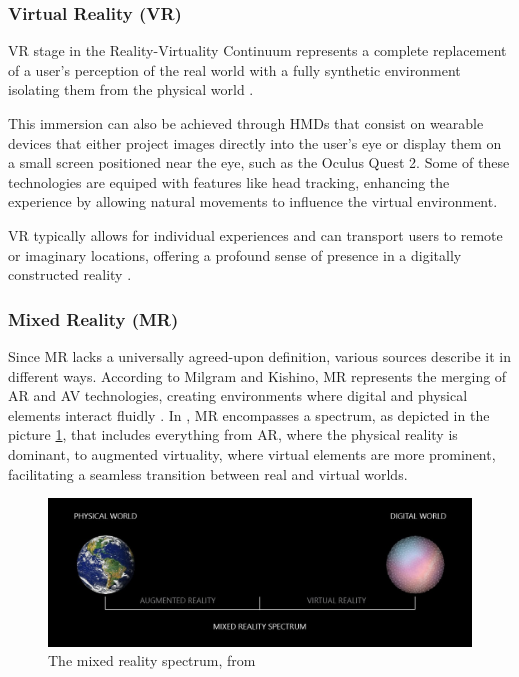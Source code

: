 \subsubsection{Virtual Reality (\ac{VR})}
    
    \ac{VR} stage in the Reality-Virtuality Continuum represents a complete replacement of a user’s perception of the real world with a fully synthetic environment isolating them from the physical world \cite{milgram1994}.

    This immersion can also be achieved through \ac{HMDs} that consist on wearable devices that either project images directly into the user's eye or display them on a small screen positioned near the eye, such as the Oculus Quest 2.
    Some of these technologies are equiped with features like head tracking, enhancing the experience by allowing natural movements to influence the virtual environment.
    
    \ac{VR} typically allows for individual experiences and can transport users to remote or imaginary locations, offering a profound sense 
    of presence in a digitally constructed reality \cite{whatismixedreality, 8712803}.
    

\subsubsection{Mixed Reality (\ac{MR})}

    Since \ac{MR} lacks a universally agreed-upon definition, various sources describe it in different ways. 
    According to Milgram and Kishino, \ac{MR} represents the merging of \ac{AR} and \ac{AV} technologies, creating environments where digital and physical elements interact fluidly \cite{milgram1994}. 
    In \cite{microsoft_mixed_reality}, \ac{MR} encompasses a spectrum, as depicted in the picture \ref{f:mixed-spectrum}, that includes everything
    from \ac{AR}, where the physical reality is dominant, to augmented virtuality, where virtual elements are more prominent, facilitating a seamless
    transition between real and virtual worlds.

    \begin{figure}[!htpb]
        \centering
        \includegraphics[width=0.8\linewidth]{figs/mixed-reality-spectrum.jpeg}
        \caption{The mixed reality spectrum, from \cite{microsoft_mixed_reality}}
        \label{f:mixed-spectrum}
    \end{figure}
    
